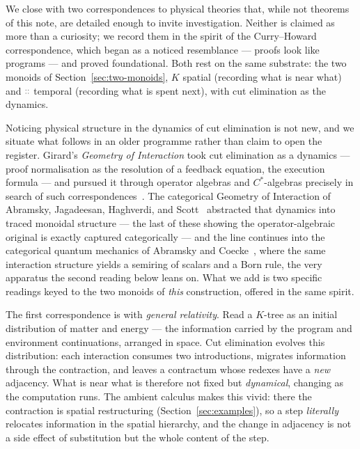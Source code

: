 \documentclass[11pt]{article}
\theoremstyle{definition}
\theoremstyle{plain}
\newcommand{\dec}[1]{\textcolor{costgray}{#1}}   %
\newcommand{\cons}{\mathbin{\dec{\dblcolon}}}  %
\begin{document}
We close with two correspondences to physical theories that, while not
theorems of this note, are detailed enough to invite investigation.
Neither is claimed as more than a curiosity; we record them in the spirit
of the Curry--Howard correspondence, which began as a noticed resemblance
--- proofs look like programs --- and proved foundational. Both rest on
the same substrate: the two monoids of Section~\ref{sec:two-monoids},
$K$ spatial (recording what is near what) and $\cons$ temporal (recording
what is spent next), with cut elimination as the dynamics.

Noticing physical structure in the dynamics of cut elimination is not
new, and we situate what follows in an older programme rather than claim
to open the register. Girard's \emph{Geometry of Interaction} took cut
elimination as a dynamics --- proof normalisation as the resolution of a
feedback equation, the execution formula --- and pursued it through
operator algebras and $C^*$-algebras precisely in search of such
correspondences~\cite{GirardGoI,GirardGoI1}. The categorical Geometry of
Interaction of Abramsky, Jagadeesan, Haghverdi, and
Scott~\cite{AbramskyJagadeesan1994,AbramskyHaghverdiScott2002,HaghverdiScott2006}
abstracted that dynamics into traced monoidal structure --- the last of
these showing the operator-algebraic original is exactly captured
categorically --- and the line continues into the categorical quantum
mechanics of Abramsky and Coecke~\cite{AbramskyCoecke2004}, where the same
interaction structure yields a semiring of scalars and a Born rule, the
very apparatus the second reading below leans on. What we add is two
specific readings keyed to the two monoids of \emph{this} construction,
offered in the same spirit.

The first correspondence is with \emph{general relativity}. Read a
$K$-tree as an initial distribution of matter and
energy --- the information carried by the program and environment
continuations, arranged in space. Cut elimination evolves this
distribution: each interaction consumes two introductions, migrates
information through the contraction, and leaves a contractum whose redexes
have a \emph{new} adjacency. What is near what is therefore not fixed but
\emph{dynamical}, changing as the computation runs. The ambient calculus
makes this vivid: there the contraction is spatial restructuring
(Section~\ref{sec:examples}), so a step \emph{literally} relocates
information in the spatial hierarchy, and the change in adjacency is not a
side effect of substitution but the whole content of the step.
\end{document}
